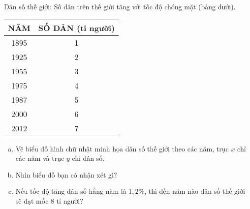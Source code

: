 \begin{bt}%
	Dân số thế giới: Số dân trên thế giới tăng với tốc độ chóng mặt (bảng dưới).
	\begin{center}
		\begin{tabular}{|c|c|}
			\hline
			NĂM & SỐ DÂN (tỉ người)\\
			\hline
			1895 & 1\\
			\hline
			1925 & 2\\
			\hline
			1955 & 3\\
			\hline
			1975 & 4\\
			\hline
			1987 & 5\\
			\hline
			2000 & 6\\
			\hline
			2012 & 7\\
			\hline
		\end{tabular}
	\end{center}
	\begin{enumerate}[a)]
		\item Vẽ biểu đồ hình chữ nhật minh họa dân số thế giới theo các năm, trục $x$ chỉ các năm và trục $y$ chỉ dân số.
		\item Nhìn biểu đồ bạn có nhận xét gì?
		\item Nếu tốc độ tăng dân số hằng năm là $1,2\%$, thì đến năm nào dân số thế giới sẽ đạt mốc 8 tỉ người?
	\end{enumerate}	
\end{bt}

